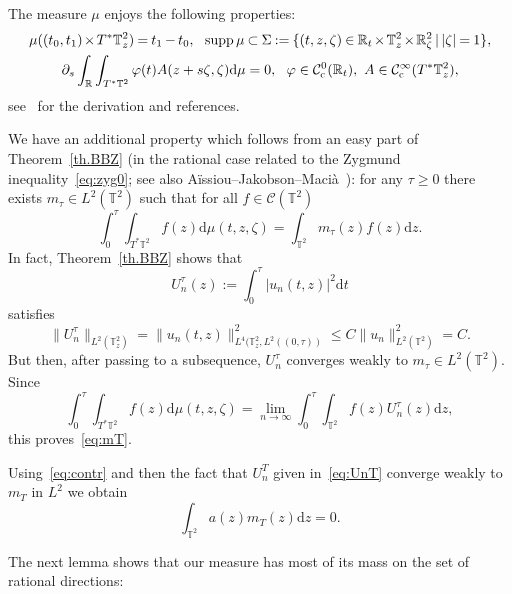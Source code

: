 \documentclass[10pt]{amsart}
\theoremstyle{definition}\newtheorem{defi}[theo]{Definition}\newtheorem{rema}[theo]{Remark}\newtheorem{exam}[theo]{Example}\newtheorem{exem}[theo]{Example}\newtheorem{nota}[theo]{Notation}
\DeclareMathOperator{\supp}{supp}
\newcommand{\CIc}{{\mathcal C}^\infty_{\mathrm{c}} }
\newcommand{\R}{{\mathbb R}}
\newcommand{\TT}{{\mathbb T}}
\newcommand*{\dd}{\mathrm{d}}
\newcommand*{\dz}{\dd z}
\newcommand*{\dt}{\dd t}
\newcommand*{\dmu}{\dd \mu}
\newcommand*{\mk}{\mkern -1mu}
\newcommand*{\Mk}{\mkern -2mu}
\newcommand*{\tq}{\,|\,}
\begin{document}
The measure $ \mu $ enjoys the following properties:
\begin{gather}\label{eq:propmu}
\begin{gathered}
\!\mu ((t_0, t_1) \Mk\times\Mk T^*\TT^2_z) \mk=\mk t_1 \mk-\mk t_0, \ \
\supp \mu \mk\subset\mk \Sigma \mk:=\mk \{(t,z, \zeta) \mk\in\mk \R_t \Mk\times\Mk \TT^2_z \Mk\times\Mk \R^2_\zeta \tq |\zeta|\mk=\mk 1\},\! \\
\partial_s \int_{\R} \int_{ T^* \TT^2 } \varphi(t) A (z + s \zeta, \zeta) \dmu = 0,
\ \ \varphi \in {\mathcal C}^0_{\mathrm{c}} (\R_t), \ A \in \CIc (T^*\TT^2_z),
\end{gathered}
\end{gather}
see~\cite{Ma} for the derivation and references.

We have an additional property which follows from an easy part of Theorem~\ref{th.BBZ} (in the rational case related to the Zygmund inequality~\eqref{eq:zyg0}; see also Aïssiou--Jakobson--Macià~\cite[Theorem~1.2]{AJM}): for any $ \tau \geq 0 $ there exists $ m_\tau
\in L^2 (\TT^2) $ such that for all $ f \in \mathcal C (\TT^2) $
\begin{equation}\label{eq:mT}
\int_{0}^\tau \!\!\int_{ T^* \TT^2 } f (z) \dmu (t, z, \zeta) =
\int_{\TT^2 } m_\tau (z) f (z) \dz.
\end{equation}
In fact, Theorem~\ref{th.BBZ} shows that
\begin{equation}\label{eq:UnT}
U_n^\tau (z) := \int_{0}^\tau | u_n (t, z) |^2 \dt
\end{equation}
satisfies
\begin{equation}\label{eq:prop22}
\| U^\tau_n \|_{ L^2 (\TT^2_z) } = \| u_n (t, z) \|_{ L^4 (\TT^2_z, L^2 ((0, \tau)) }^2 \leq C \| u_n \|_{L^2 (\TT^2) }^2 = C.
\end{equation}
But then, after passing to a subsequence, $ U_n^\tau $ converges weakly to $ m_\tau \in L^2 (\TT^2) $. Since
\[
\int_{0}^\tau \int_{ T^* \TT^2 } f (z) \dmu (t, z, \zeta) = \lim_{ n \to \infty } \int_{0}^\tau \int_{\TT^2} f (z) U_n^\tau (z) \dz,
\]
this proves~\eqref{eq:mT}.

Using~\eqref{eq:contr} and then the fact that $ U_n^T $ given in~\eqref{eq:UnT} converge weakly to $ m_T $ in $ L^2$ we obtain
\begin{equation}\label{eq:l1}
\int_{\TT^2 } a (z) m_T (z) \dz = 0.
\end{equation}

The next lemma shows that our measure has most of its mass on the set of rational directions:
\end{document}
